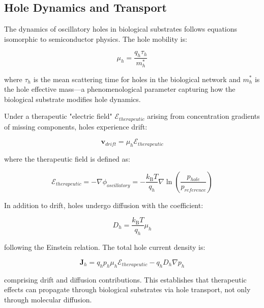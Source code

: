 \documentclass{article}
\newcommand{\kB}{k_\mathrm{B}}
\theoremstyle{definition}
\theoremstyle{remark}
\begin{document}
\subsection{Hole Dynamics and Transport}

The dynamics of oscillatory holes in biological substrates follows equations isomorphic to semiconductor physics. The hole mobility is:

\begin{equation}
\mu_h = \frac{q_h \tau_h}{m_h^*}
\label{eq:hole_mobility}
\end{equation}

where $\tau_h$ is the mean scattering time for holes in the biological network and $m_h^*$ is the hole effective mass—a phenomenological parameter capturing how the biological substrate modifies hole dynamics.

Under a therapeutic "electric field" $\mathcal{E}_{therapeutic}$ arising from concentration gradients of missing components, holes experience drift:

\begin{equation}
\mathbf{v}_{drift} = \mu_h \mathcal{E}_{therapeutic}
\label{eq:hole_drift}
\end{equation}

where the therapeutic field is defined as:

\begin{equation}
\mathcal{E}_{therapeutic} = -\nabla \phi_{oscillatory} = -\frac{\kB T}{q_h} \nabla \ln\left(\frac{p_{hole}}{p_{reference}}\right)
\label{eq:therapeutic_field}
\end{equation}

In addition to drift, holes undergo diffusion with the coefficient:

\begin{equation}
D_h = \frac{\kB T}{q_h} \mu_h
\label{eq:einstein_relation}
\end{equation}

following the Einstein relation. The total hole current density is:

\begin{equation}
\mathbf{J}_h = q_h p_h \mu_h \mathcal{E}_{therapeutic} - q_h D_h \nabla p_h
\label{eq:hole_current}
\end{equation}

comprising drift and diffusion contributions. This establishes that therapeutic effects can propagate through biological substrates via hole transport, not only through molecular diffusion.
\end{document}
